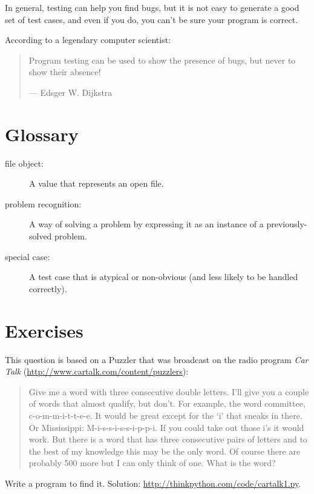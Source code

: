 \documentclass[10pt]{book}
\begin{document}
In general, testing can help you find bugs, but it is not easy to
generate a good set of test cases, and even if you do, you can't
be sure your program is correct.

According to a legendary computer scientist:

\begin{quote}
Program testing can be used to show the presence of bugs, but never to
show their absence!

--- Edsger W. Dijkstra
\end{quote}


\section{Glossary}

\begin{description}

\item[file object:] A value that represents an open file.

\item[problem recognition:] A way of solving a problem by
expressing it as an instance of a previously-solved problem.

\item[special case:] A test case that is atypical or non-obvious
(and less likely to be handled correctly).

\end{description}


\section{Exercises}

\begin{exercise}

This question is based on a Puzzler that was broadcast on the radio
program {\em Car Talk}
(\url{http://www.cartalk.com/content/puzzlers}):

\begin{quote}
Give me a word with three consecutive double letters. I'll give you a
couple of words that almost qualify, but don't. For example, the word
committee, c-o-m-m-i-t-t-e-e. It would be great except for the `i' that
sneaks in there. Or Mississippi: M-i-s-s-i-s-s-i-p-p-i. If you could
take out those i's it would work. But there is a word that has three
consecutive pairs of letters and to the best of my knowledge this may
be the only word. Of course there are probably 500 more but I can only
think of one. What is the word?
\end{quote}

Write a program to find it.  Solution: \url{http://thinkpython.com/code/cartalk1.py}.

\end{exercise}
\end{document}
